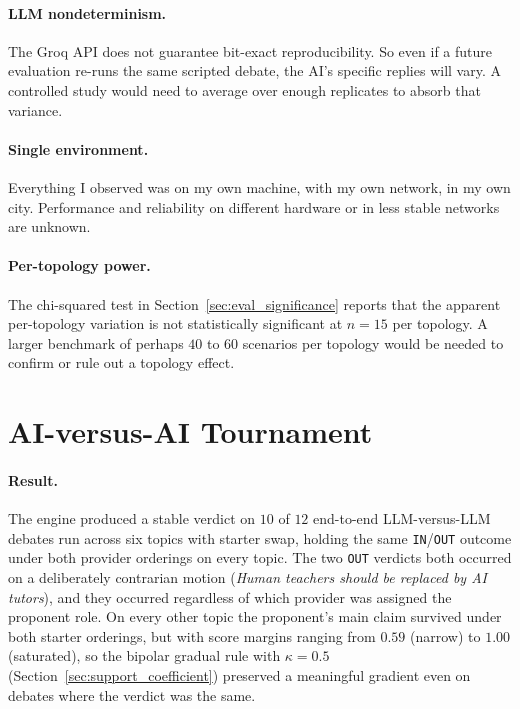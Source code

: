 \paragraph{LLM nondeterminism.} The Groq API does not guarantee bit-exact reproducibility. So even if a future evaluation re-runs the same scripted debate, the AI's specific replies will vary. A controlled study would need to average over enough replicates to absorb that variance.

\paragraph{Single environment.} Everything I observed was on my own machine, with my own network, in my own city. Performance and reliability on different hardware or in less stable networks are unknown.

\paragraph{Per-topology power.} The chi-squared test in Section~\ref{sec:eval_significance} reports that the apparent per-topology variation is not statistically significant at $n=15$ per topology. A larger benchmark of perhaps $40$ to $60$ scenarios per topology would be needed to confirm or rule out a topology effect.


\section{AI-versus-AI Tournament}
\label{sec:aivai_tournament}

\paragraph{Result.}
The engine produced a stable verdict on $10$ of $12$ end-to-end LLM-versus-LLM debates run across six topics with starter swap, holding the same \texttt{IN}/\texttt{OUT} outcome under both provider orderings on every topic. The two \texttt{OUT} verdicts both occurred on a deliberately contrarian motion (\emph{Human teachers should be replaced by AI tutors}), and they occurred regardless of which provider was assigned the proponent role. On every other topic the proponent's main claim survived under both starter orderings, but with score margins ranging from $0.59$ (narrow) to $1.00$ (saturated), so the bipolar gradual rule with $\kappa = 0.5$ (Section~\ref{sec:support_coefficient}) preserved a meaningful gradient even on debates where the verdict was the same.

